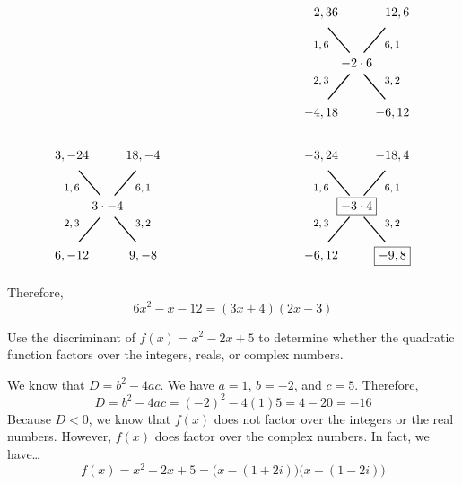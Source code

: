 \documentclass[11pt,letterpaper]{article}
\begin{document}
\[\begin{tikzpicture}
	\node at (0,0) {$-2 \cdot 6$};

	\node at (-1,0.5) {\footnotesize$1, 6$};
	\draw[line width=0.03cm,label={1}] (-0.2,0.3) -- (-0.8,1);
	\node at (-1,1.4) {$-2, 36$};

	\node at (1,0.5) {\footnotesize$6, 1$};
	\draw[line width=0.03cm,label={1}] (0.2,0.3) -- (0.8,1);
	\node at (1,1.4) {$-12, 6$};	
	
	\node at (-1,-0.5) {\footnotesize$2, 3$};
	\draw[line width=0.03cm,label={1}] (-0.2,-0.3) -- (-0.8,-1);
	\node at (-1,-1.4) {$-4, 18$};

	\node at (1,-0.5) {\footnotesize$3, 2$};
	\draw[line width=0.03cm,label={1}] (0.2,-0.3) -- (0.8,-1);
	\node at (1,-1.4) {$-6, 12$};	
	
	\tikzset{shift={(-7,-4)}}
	
	\node at (0,0) {$3 \cdot -4$};

	\node at (-1,0.5) {\footnotesize$1, 6$};
	\draw[line width=0.03cm,label={1}] (-0.2,0.3) -- (-0.8,1);
	\node at (-1,1.4) {$3, -24$};

	\node at (1,0.5) {\footnotesize$6, 1$};
	\draw[line width=0.03cm,label={1}] (0.2,0.3) -- (0.8,1);
	\node at (1,1.4) {$18, -4$};	
	
	\node at (-1,-0.5) {\footnotesize$2, 3$};
	\draw[line width=0.03cm,label={1}] (-0.2,-0.3) -- (-0.8,-1);
	\node at (-1,-1.4) {$6, -12$};

	\node at (1,-0.5) {\footnotesize$3, 2$};
	\draw[line width=0.03cm,label={1}] (0.2,-0.3) -- (0.8,-1);
	\node at (1,-1.4) {$9, -8$};	

	\tikzset{shift={(7,0)}}
	
	\node at (0,0) {\framebox{$-3 \cdot 4$}};

	\node at (-1,0.5) {\footnotesize$1, 6$};
	\draw[line width=0.03cm,label={1}] (-0.2,0.3) -- (-0.8,1);
	\node at (-1,1.4) {$-3, 24$};

	\node at (1,0.5) {\footnotesize$6, 1$};
	\draw[line width=0.03cm,label={1}] (0.2,0.3) -- (0.8,1);
	\node at (1,1.4) {$-18, 4$};	
	
	\node at (-1,-0.5) {\footnotesize$2, 3$};
	\draw[line width=0.03cm,label={1}] (-0.2,-0.3) -- (-0.8,-1);
	\node at (-1,-1.4) {$-6, 12$};

	\node at (1,-0.5) {\footnotesize$3, 2$};
	\draw[line width=0.03cm,label={1}] (0.2,-0.3) -- (0.8,-1);
	\node at (1,-1.4) {\framebox{$-9, 8$}};		
	\end{tikzpicture}
	\]

Therefore, 
	\[
	6x^2 - x - 12= (3x + 4)(2x - 3)
	\]



\newpage



 Use the discriminant of $f(x)= x^2 - 2x + 5$ to determine whether the quadratic function factors over the integers, reals, or complex numbers. \pspace

\sol We know that $D= b^2 - 4ac$. We have $a= 1$, $b= -2$, and $c= 5$. Therefore,
	\[
	D= b^2 - 4ac= (-2)^2 - 4(1)5= 4 - 20= -16
	\]
Because $D < 0$, we know that $f(x)$ does not factor over the integers or the real numbers. However, $f(x)$ does factor over the complex numbers. In fact, we have\dots
	\[
	f(x)= x^2 - 2x + 5= \big( x - (1 + 2i) \big) \big( x - (1 - 2i) \big) 
	\]
\end{document}
